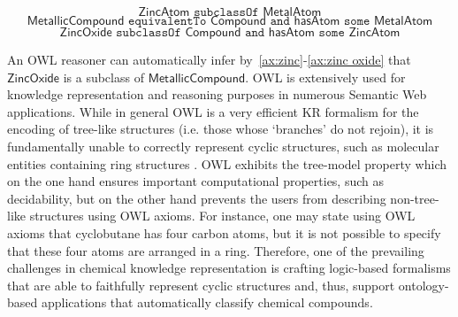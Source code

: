 \documentclass[10pt]{bmc_article}
\newenvironment{bmcformat}{\baselineskip20pt\sloppy\setboolean{publ}{false}}{\baselineskip20pt\sloppy}
\begin{document}
\begin{bmcformat}
\begin{equation} \label{ax:zinc}\mathsf{ZincAtom} \texttt{ subclassOf } \mathsf{MetalAtom}\end{equation} 
\begin{equation}\label{ax:metallic compound}\mathsf{MetallicCompound} \texttt{ equivalentTo } \mathsf{Compound} \texttt{ and } \mathsf{hasAtom} \texttt{ some } \mathsf{MetalAtom}\end{equation}
\begin{equation}\label{ax:zinc oxide} \mathsf{ZincOxide} \texttt{ subclassOf } \mathsf{Compound} \texttt{ and } \mathsf{hasAtom}  \texttt{ some } \mathsf{ZincAtom}\end{equation} 
 
An OWL reasoner can automatically infer by~\eqref{ax:zinc}-\eqref{ax:zinc oxide}  that $\mathsf{ZincOxide}$ is a subclass of $\mathsf{MetallicCompound}$.
OWL is extensively used for knowledge representation and reasoning purposes in numerous Semantic Web applications.%
While in general OWL is a very efficient KR formalism for the encoding of tree-like structures (i.e. those whose `branches' do not rejoin), it is fundamentally unable to correctly represent cyclic structures, such as molecular entities containing ring structures \cite{magka2011}.
OWL exhibits the tree-model property \cite{VardiModalLogic} which on the one hand ensures important computational properties, such as decidability, but on the other hand prevents the users from describing non-tree-like structures using OWL axioms. For instance, one may state using OWL axioms that cyclobutane has four carbon atoms, but it is not possible to specify that these four atoms are arranged in a ring. Therefore, one of the prevailing challenges in chemical knowledge representation is crafting logic-based formalisms that are able to faithfully represent cyclic structures and, thus, support ontology-based applications that automatically classify chemical compounds.


\end{bmcformat}
\end{document}
